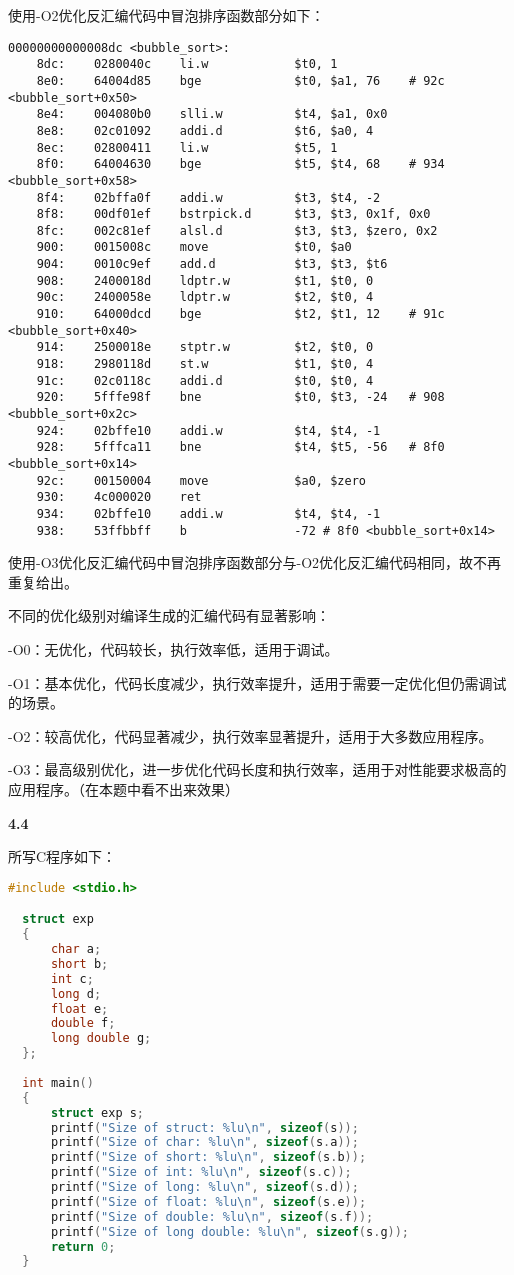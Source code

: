 \documentclass[UTF8]{report}
\begin{document}
  使用-O2优化反汇编代码中冒泡排序函数部分如下：

  \begin{lstlisting}[language=LoongArch]
    00000000000008dc <bubble_sort>:
    8dc:	0280040c 	li.w        	$t0, 1
    8e0:	64004d85 	bge         	$t0, $a1, 76	# 92c <bubble_sort+0x50>
    8e4:	004080b0 	slli.w      	$t4, $a1, 0x0
    8e8:	02c01092 	addi.d      	$t6, $a0, 4
    8ec:	02800411 	li.w        	$t5, 1
    8f0:	64004630 	bge         	$t5, $t4, 68	# 934 <bubble_sort+0x58>
    8f4:	02bffa0f 	addi.w      	$t3, $t4, -2
    8f8:	00df01ef 	bstrpick.d  	$t3, $t3, 0x1f, 0x0
    8fc:	002c81ef 	alsl.d      	$t3, $t3, $zero, 0x2
    900:	0015008c 	move        	$t0, $a0
    904:	0010c9ef 	add.d       	$t3, $t3, $t6
    908:	2400018d 	ldptr.w     	$t1, $t0, 0
    90c:	2400058e 	ldptr.w     	$t2, $t0, 4
    910:	64000dcd 	bge         	$t2, $t1, 12	# 91c <bubble_sort+0x40>
    914:	2500018e 	stptr.w     	$t2, $t0, 0
    918:	2980118d 	st.w        	$t1, $t0, 4
    91c:	02c0118c 	addi.d      	$t0, $t0, 4
    920:	5fffe98f 	bne         	$t0, $t3, -24	# 908 <bubble_sort+0x2c>
    924:	02bffe10 	addi.w      	$t4, $t4, -1
    928:	5fffca11 	bne         	$t4, $t5, -56	# 8f0 <bubble_sort+0x14>
    92c:	00150004 	move        	$a0, $zero
    930:	4c000020 	ret         
    934:	02bffe10 	addi.w      	$t4, $t4, -1
    938:	53ffbbff 	b           	-72	# 8f0 <bubble_sort+0x14>
  \end{lstlisting}
  
  使用-O3优化反汇编代码中冒泡排序函数部分与-O2优化反汇编代码相同，故不再重复给出。

  不同的优化级别对编译生成的汇编代码有显著影响：

  -O0：无优化，代码较长，执行效率低，适用于调试。

  -O1：基本优化，代码长度减少，执行效率提升，适用于需要一定优化但仍需调试的场景。

  -O2：较高优化，代码显著减少，执行效率显著提升，适用于大多数应用程序。

  -O3：最高级别优化，进一步优化代码长度和执行效率，适用于对性能要求极高的应用程序。（在本题中看不出来效果）
  
\noindent
\textbf{4.4}

所写C程序如下：

\begin{lstlisting}[language=C]
  #include <stdio.h>

  struct exp
  {
      char a;
      short b;
      int c;
      long d;
      float e;
      double f;
      long double g;
  };
  
  int main()
  {
      struct exp s;
      printf("Size of struct: %lu\n", sizeof(s));
      printf("Size of char: %lu\n", sizeof(s.a));
      printf("Size of short: %lu\n", sizeof(s.b));
      printf("Size of int: %lu\n", sizeof(s.c));
      printf("Size of long: %lu\n", sizeof(s.d));
      printf("Size of float: %lu\n", sizeof(s.e));
      printf("Size of double: %lu\n", sizeof(s.f));
      printf("Size of long double: %lu\n", sizeof(s.g));
      return 0;
  }
\end{lstlisting}
\end{document}
